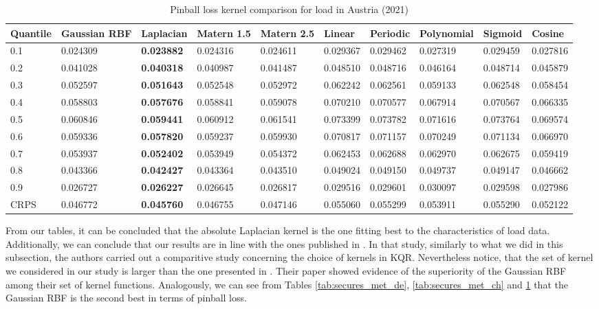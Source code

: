 \begin{table}[!ht]
    \centering
\caption{Pinball loss kernel comparison for load in Austria (2021)}
\label{tab:secures_met_at}
\begin{adjustbox}{width=\textwidth}
    \begin{tabular}{llllllllll}
\toprule
Quantile & Gaussian RBF & Laplacian & Matern 1.5 & Matern 2.5 & Linear & Periodic & Polynomial & Sigmoid & Cosine \\
\midrule
0.1 & 0.024309 & \textbf{0.023882} & 0.024316 & 0.024611 & 0.029367 & 0.029462 & 0.027319 & 0.029459 & 0.027816 \\
0.2 & 0.041028 & \textbf{0.040318} & 0.040987 & 0.041487 & 0.048510 & 0.048716 & 0.046164 & 0.048714 & 0.045879 \\
0.3 & 0.052597 & \textbf{0.051643} & 0.052548 & 0.052972 & 0.062242 & 0.062561 & 0.059133 & 0.062548 & 0.058454 \\
0.4 & 0.058803 & \textbf{0.057676} & 0.058841 & 0.059078 & 0.070210 & 0.070577 & 0.067914 & 0.070567 & 0.066335 \\
0.5 & 0.060846 & \textbf{0.059441} & 0.060912 & 0.061541 & 0.073399 & 0.073782 & 0.071616 & 0.073764 & 0.069574 \\
0.6 & 0.059336 & \textbf{0.057820} & 0.059237 & 0.059930 & 0.070817 & 0.071157 & 0.070249 & 0.071134 & 0.066970 \\
0.7 & 0.053937 & \textbf{0.052402} & 0.053949 & 0.054372 & 0.062453 & 0.062688 & 0.062970 & 0.062675 & 0.059419 \\
0.8 & 0.043366 & \textbf{0.042427} & 0.043364 & 0.043510 & 0.049024 & 0.049150 & 0.049737 & 0.049147 & 0.046662 \\
0.9 & 0.026727 & \textbf{0.026227} & 0.026645 & 0.026817 & 0.029516 & 0.029601 & 0.030097 & 0.029598 & 0.027986 \\
\midrule
CRPS & 0.046772 & \textbf{0.045760} & 0.046755 & 0.047146 & 0.055060 & 0.055299 & 0.053911 & 0.055290 & 0.052122 \\
\bottomrule
\end{tabular}
\end{adjustbox}
\end{table}
From our tables, it can be concluded that the absolute Laplacian kernel is the one fitting best to the characteristics of load data.
Additionally, we can conclude that our results are in line with the ones published in \cite{he2017short}. In that study, similarly to what we did in this subsection, the authors carried out a comparitive study concerning the choice of kernels in KQR. Nevertheless notice, that the set of kernel we considered in our study is larger than the one presented in \cite{he2017short}.
Their paper showed evidence of the superiority of the Gaussian RBF among their set of kernel functions. Analogously, we can see from Tables \ref{tab:secures_met_de}, \ref{tab:secures_met_ch} and \ref{tab:secures_met_at} that the Gaussian RBF is the second best in terms of pinball loss.

